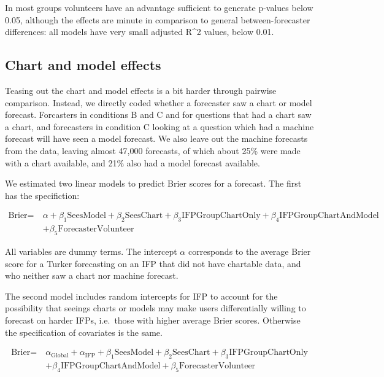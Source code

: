 \documentclass[]{article}
\begin{document}
In most groups volunteers have an advantage sufficient to generate
p-values below 0.05, although the effects are minute in comparison to
general between-forecaster differences: all models have very small
adjusted R\^{}2 values, below 0.01.

\subsection{Chart and model effects}\label{chart-and-model-effects}

Teasing out the chart and model effects is a bit harder through pairwise
comparison. Instead, we directly coded whether a forecaster saw a chart
or model forecast. Forcasters in conditions B and C and for questions
that had a chart saw a chart, and forecasters in condition C looking at
a question which had a machine forecast will have seen a model forecast.
We also leave out the machine forecasts from the data, leaving almost
47,000 forecasts, of which about 25\% were made with a chart available,
and 21\% also had a model forecast available.

We estimated two linear models to predict Brier scores for a forecast.
The first has the specifiction:

\[
\begin{aligned}
\textrm{Brier} =~& \alpha + \beta_1\textrm{SeesModel} + \beta_2\textrm{SeesChart} + \beta_3\textrm{IFPGroupChartOnly} + \beta_4\textrm{IFPGroupChartAndModel} \\
 & + \beta_5\textrm{ForecasterVolunteer} 
\end{aligned}
\]

All variables are dummy terms. The intercept \(\alpha\) corresponds to
the average Brier score for a Turker forecasting on an IFP that did not
have chartable data, and who neither saw a chart nor machine forecast.

The second model includes random intercepts for IFP to account for the
possibility that seeings charts or models may make users differentially
willing to forecast on harder IFPs, i.e.~those with higher average Brier
scores. Otherwise the specification of covariates is the same.

\[
\begin{aligned}
\textrm{Brier} =~& \alpha_{\textrm{Global}} + \alpha_{\textrm{IFP}} + \beta_1\textrm{SeesModel} + \beta_2\textrm{SeesChart} + \beta_3\textrm{IFPGroupChartOnly}  \\
 & + \beta_4\textrm{IFPGroupChartAndModel} + \beta_5\textrm{ForecasterVolunteer} 
\end{aligned}
\]
\end{document}
